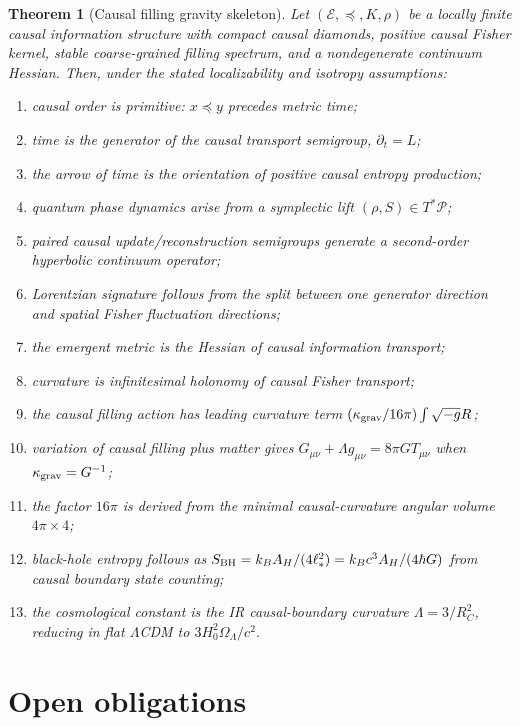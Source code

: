 \documentclass[11pt]{article}
\newtheorem{theorem}[definition]{Theorem}
\newcommand{\E}{\mathcal E}
\newcommand{\pre}{\preceq}
\begin{document}
\begin{theorem}[Causal filling gravity skeleton]
Let $(\E,\pre,K,\rho)$ be a locally finite causal information structure with compact causal diamonds, positive causal Fisher kernel, stable coarse-grained filling spectrum, and a nondegenerate continuum Hessian. Then, under the stated localizability and isotropy assumptions:
\begin{enumerate}[label=(\roman*)]
\item causal order is primitive: $x\pre y$ precedes metric time;
\item time is the generator of the causal transport semigroup, $\partial_t=L$;
\item the arrow of time is the orientation of positive causal entropy production;
\item quantum phase dynamics arise from a symplectic lift $(\rho,S)\in T^*\mathcal P$;
\item paired causal update/reconstruction semigroups generate a second-order hyperbolic continuum operator;
\item Lorentzian signature follows from the split between one generator direction and spatial Fisher fluctuation directions;
\item the emergent metric is the Hessian of causal information transport;
\item curvature is infinitesimal holonomy of causal Fisher transport;
\item the causal filling action has leading curvature term $(\kappa_{\rm grav}/16\pi)\int\sqrt{-g}R$;
\item variation of causal filling plus matter gives $G_{\mu\nu}+\Lambda g_{\mu\nu}=8\pi G T_{\mu\nu}$ when $\kappa_{\rm grav}=G^{-1}$;
\item the factor $16\pi$ is derived from the minimal causal-curvature angular volume $4\pi\times4$;
\item black-hole entropy follows as $S_{\rm BH}=k_BA_H/(4\ell_*^2)=k_Bc^3A_H/(4\hbar G)$ from causal boundary state counting;
\item the cosmological constant is the IR causal-boundary curvature $\Lambda=3/R_C^2$, reducing in flat $\Lambda$CDM to $3H_0^2\Omega_\Lambda/c^2$.
\end{enumerate}
\end{theorem}

\section{Open obligations}
\end{document}
